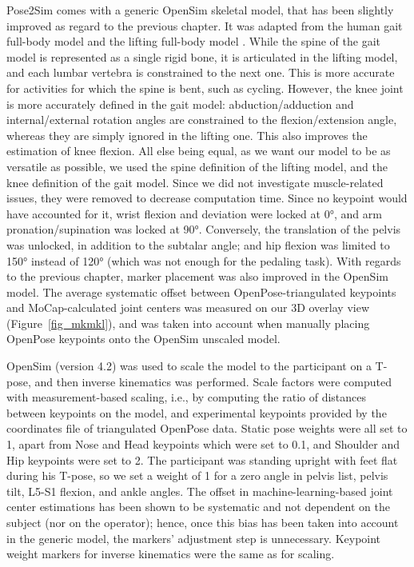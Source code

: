 Pose2Sim comes with a generic OpenSim skeletal model, that has been slightly improved as regard to the previous chapter. It was adapted from the human gait full-body model \cite{Rajagopal2016} and the lifting full-body model \cite{Beaucage-Gauvreau2019}. While the spine of the gait model is represented as a single rigid bone, it is articulated in the lifting model, and each lumbar vertebra is constrained to the next one. This is more accurate for activities for which the spine is bent, such as cycling. However, the knee joint is more accurately defined in the gait model: abduction/adduction and internal/external rotation angles are constrained to the flexion/extension angle, whereas they are simply ignored in the lifting one. This also improves the estimation of knee flexion. All else being equal, as we want our model to be as versatile as possible, we used the spine definition of the lifting model, and the knee definition of the gait model. Since we did not investigate muscle-related issues, they were removed to decrease computation time. Since no keypoint would have accounted for it, wrist flexion and deviation were locked at 0°, and arm pronation/supination was locked at 90°. Conversely, the translation of the pelvis was unlocked, in addition to the subtalar angle; and hip flexion was limited to 150° instead of 120° (which was not enough for the pedaling task). With regards to the previous chapter, marker placement was also improved in the OpenSim model. The average systematic offset between OpenPose-triangulated keypoints and MoCap-calculated joint centers was measured on our 3D overlay view (Figure~\ref{fig_mkmkl}), and was taken into account when manually placing OpenPose keypoints onto the OpenSim unscaled model.

OpenSim (version 4.2) was used to scale the model to the participant on a T-pose, and then inverse kinematics was performed. Scale factors were computed with measurement-based scaling, i.e., by computing the ratio of distances between keypoints on the model, and experimental keypoints provided by the coordinates file of triangulated OpenPose data. Static pose weights were all set to 1, apart from Nose and Head keypoints which were set to 0.1, and Shoulder and Hip keypoints were set to 2. The participant was standing upright with feet flat during his T-pose, so we set a weight of 1 for a zero angle in pelvis list, pelvis tilt, L5-S1 flexion, and ankle angles. The offset in machine-learning-based joint center estimations has been shown to be systematic and not dependent on the subject \cite{Needham2021b} (nor on the operator); hence, once this bias has been taken into account in the generic model, the markers’ adjustment step is unnecessary. Keypoint weight markers for inverse kinematics were the same as for scaling.


